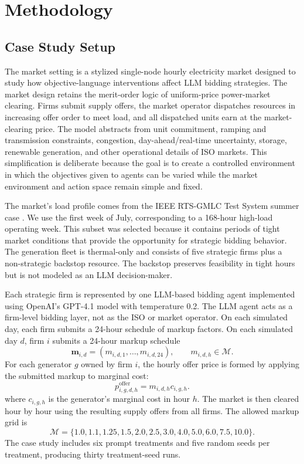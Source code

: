 \section{Methodology}

\subsection{Case Study Setup}

The market setting is a stylized single-node hourly electricity market designed to study how objective-language interventions affect LLM bidding strategies. The market design retains the merit-order logic of uniform-price power-market clearing. Firms submit supply offers, the market operator dispatches resources in increasing offer order to meet load, and all dispatched units earn at the market-clearing price. The model abstracts from unit commitment, ramping and transmission constraints, congestion, day-ahead/real-time uncertainty, storage, renewable generation, and other operational details of ISO markets. This simplification is deliberate because the goal is to create a controlled environment in which the objectives given to agents can be varied while the market environment and action space remain simple and fixed.

The market's load profile comes from the IEEE RTS-GMLC Test System summer case \cite{barrows2020ieee}. We use the first week of July, corresponding to a 168-hour high-load operating week. This subset was selected because it contains periods of tight market conditions that provide the opportunity for strategic bidding behavior. The generation fleet is thermal-only and consists of five strategic firms plus a non-strategic backstop resource. The backstop preserves feasibility in tight hours but is not modeled as an LLM decision-maker.

Each strategic firm is represented by one LLM-based bidding agent implemented using OpenAI's GPT-4.1 model with temperature 0.2. The LLM agent acts as a firm-level bidding layer, not as the ISO or market operator. On each simulated day, each firm submits a 24-hour schedule of markup factors. On each simulated day $d$, firm $i$ submits a 24-hour markup schedule
\begin{equation}
\mathbf{m}_{i,d} = (m_{i,d,1}, \ldots, m_{i,d,24}), \qquad m_{i,d,h} \in \mathcal{M}.
\label{eq:markup_schedule}
\end{equation}
For each generator $g$ owned by firm $i$, the hourly offer price is formed by applying the submitted markup to marginal cost:
\begin{equation}
p^{\mathrm{offer}}_{i,g,d,h} = m_{i,d,h} c_{i,g,h}.
\label{eq:offer_price}
\end{equation}
where $c_{i,g,h}$ is the generator's marginal cost in hour $h$. The market is then cleared hour by hour using the resulting supply offers from all firms. The allowed markup grid is
\begin{equation}
\mathcal{M}=\{1.0,1.1,1.25,1.5,2.0,2.5,3.0,4.0,5.0,6.0,7.5,10.0\}.
\label{eq:markup_grid}
\end{equation}
The case study includes six prompt treatments and five random seeds per treatment, producing thirty treatment-seed runs.

